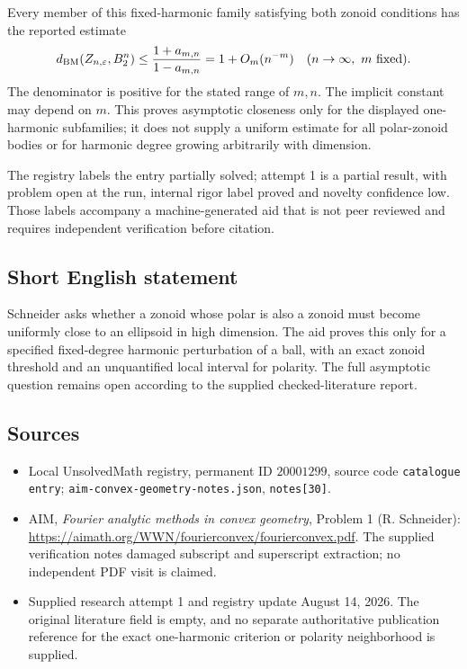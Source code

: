 \documentclass[11pt]{article}
\begin{document}
Every member of this fixed-harmonic family satisfying both zonoid conditions has the reported estimate
\[
d_{\rm BM}(Z_{n,\varepsilon},B_2^n)
\le\frac{1+a_{m,n}}{1-a_{m,n}}
=1+O_m(n^{-m})\quad(n\to\infty,\ m\text{ fixed}).
\]
The denominator is positive for the stated range of \(m,n\). The implicit constant may depend on \(m\). This proves asymptotic closeness only for the displayed one-harmonic subfamilies; it does not supply a uniform estimate for all polar-zonoid bodies or for harmonic degree growing arbitrarily with dimension.

The registry labels the entry partially solved; attempt 1 is a partial result, with problem open at the run, internal rigor label proved and novelty confidence low. Those labels accompany a machine-generated aid that is not peer reviewed and requires independent verification before citation.
\subsection{Short English statement}
Schneider asks whether a zonoid whose polar is also a zonoid must become uniformly close to an ellipsoid in high dimension. The aid proves this only for a specified fixed-degree harmonic perturbation of a ball, with an exact zonoid threshold and an unquantified local interval for polarity. The full asymptotic question remains open according to the supplied checked-literature report.
\subsection{Sources}
\begin{itemize}
\item Local UnsolvedMath registry, permanent ID \(20001299\), source code \texttt{catalogue entry}; \texttt{aim-convex-geometry-notes.json}, \texttt{notes[30]}.
\item AIM, \emph{Fourier analytic methods in convex geometry}, Problem 1 (R. Schneider): \url{https://aimath.org/WWN/fourierconvex/fourierconvex.pdf}. The supplied verification notes damaged subscript and superscript extraction; no independent PDF visit is claimed.
\item Supplied research attempt 1 and registry update August 14, 2026. The original literature field is empty, and no separate authoritative publication reference for the exact one-harmonic criterion or polarity neighborhood is supplied.
\end{itemize}
\end{document}
